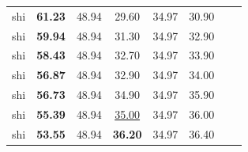 \begin{tabular}{llcccccc}
shi & \textbf{61.23} & 48.94 & 29.60 & 34.97 & 30.90 & \\
shi & \textbf{59.94} & 48.94 & 31.30 & 34.97 & 32.90 & \\
shi & \textbf{58.43} & 48.94 & 32.70 & 34.97 & 33.90 & \\
shi & \textbf{56.87} & 48.94 & 32.90 & 34.97 & 34.00 & \\
shi & \textbf{56.73} & 48.94 & 34.90 & 34.97 & 35.90 & \\
shi & \textbf{55.39} & 48.94 & \underline{35.00} & 34.97 & 36.00 & \\
shi & \textbf{53.55} & 48.94 & \textbf{36.20} & 34.97 & 36.40 & \\
\bottomrule
\end{tabular}
